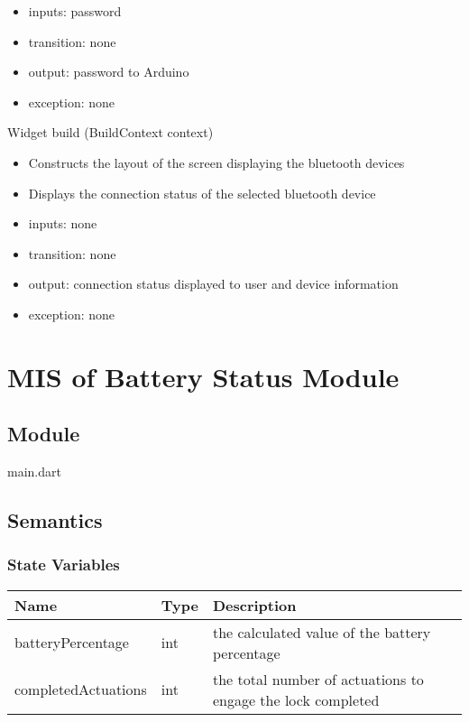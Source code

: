 \documentclass[12pt, titlepage]{article}
\begin{document}
\begin{itemize}
\item inputs: password
\item transition: none
\item output: password to Arduino
\item exception: none
\end{itemize}

\noindent Widget build (BuildContext context)
\begin{itemize}
\item Constructs the layout of the screen displaying the bluetooth devices
\item Displays the connection status of the selected bluetooth device
\end{itemize}

\begin{itemize}
\item inputs: none
\item transition: none
\item output: connection status displayed to user and device information
\item exception: none
\end{itemize}

\section{MIS of Battery Status Module} \label{mHD}

\subsection{Module}
main.dart

\subsection{Semantics}

\subsubsection{State Variables}

\begin{center}
\begin{tabular}{p{4cm} p{4cm} p{6cm}}
\hline
\textbf{Name} & \textbf{Type} & \textbf{Description} \\
\hline
batteryPercentage & int & the calculated value of the battery percentage \\
completedActuations & int & the total number of actuations to engage the lock completed \\
\hline
\end{tabular}
\end{center}
\end{document}
